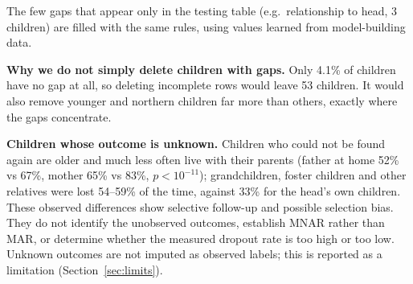 \documentclass[conference,a4paper]{IEEEtran}
\begin{document}
 The few gaps that appear only in the testing table (e.g.\ relationship to head, 3 children) are filled with the same rules, using values learned from model-building data.

\textbf{Why we do not simply delete children with gaps.} Only 4.1\% of children have no gap at all, so deleting incomplete rows would leave 53 children. It would also remove younger and northern children far more than others, exactly where the gaps concentrate.

\textbf{Children whose outcome is unknown.} Children who could not be found again are older and much less often live with their parents (father at home 52\% vs 67\%, mother 65\% vs 83\%, $p<10^{-11}$); grandchildren, foster children and other relatives were lost 54--59\% of the time, against 33\% for the head's own children. These observed differences show selective follow-up and possible selection bias. They do not identify the unobserved outcomes, establish MNAR rather than MAR, or determine whether the measured dropout rate is too high or too low. Unknown outcomes are not imputed as observed labels; this is reported as a limitation (Section~\ref{sec:limits}).
\end{document}
